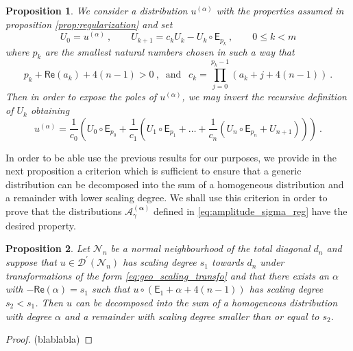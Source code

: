 \documentclass[12pt]{book}
\renewcommand{\Re}{\mathsf{Re}}
\newcommand{\Acal}{\mathcal{A}}
\newcommand{\Dcal}{\mathcal{D}}
\newcommand{\Ncal}{\mathcal{N}}
\newcommand{\Esf}{\mathsf{E}}
\theoremstyle{break}
\newtheorem{proposition}{Proposition}
\begin{document}
\begin{proposition}\label{prop:expose_poles}
We consider a distribution $u^{(\alpha)}$ with the properties assumed in proposition \ref{prop:regularization} and set
%
\begin{equation*}
U_0 = u^{(\alpha)} \ , \qquad U_{k+1} = c_k U_k - U_k \circ \Esf_{p_k} \ , \qquad 0 \leq k < m 
\end{equation*}
%
where $p_k$ are the smallest natural numbers chosen in such a way that 
%
\begin{equation*}
p_k+\Re(a_k)+4(n-1)>0 \ , \ \mbox{ and } \ \ c_k = \prod_{j=0}^{p_k-1} \left(a_k+j+4(n-1)\right) \ .
\end{equation*}
%
Then in order to expose the poles of $u^{(\alpha)}$, we may invert the recursive definition of $U_k$ obtaining
%
\begin{equation*}
u^{(\alpha)} = \frac{1}{c_0} \left( U_0\circ \Esf_{p_0} +  \frac{1}{c_1} \left( U_1 \circ \Esf_{p_1} +\dots + \frac{1}{c_n} \left( U_n \circ \Esf_{p_n} + U_{n+1} \right) \right) \right) \ .
\end{equation*}
%
\end{proposition}


In order to be able use the previous results for our purposes, we provide in the next proposition a criterion which is sufficient to ensure that a generic distribution can be decomposed into the sum of a homogeneous distribution and a remainder with lower scaling degree. We shall use this criterion in order to prove that the distributions $\Acal_\gamma^{(\boldsymbol{\alpha})}$ defined in \eqref{eq:amplitude_sigma_reg} have the desired property.


\begin{proposition}\label{prop:set}
Let $\Ncal_n$ be a normal neighbourhood of the total diagonal $d_n$ and suppose that $u\in \Dcal^\prime(\Ncal_n)$ has scaling degree $s_1$ towards $d_n$ under transformations of the form \eqref{eq:geo_scaling_transfo} and that there exists an $\alpha$ with $-\Re(\alpha)=s_1$ such that $u\circ(\Esf_1+\alpha+4(n-1))$ has scaling degree $s_2 < s_1$. Then $u$ can be decomposed into the sum of a homogeneous distribution with degree $\alpha$ and a remainder with scaling degree smaller than or equal to $s_2$.
\end{proposition}


\begin{proof}
(blablabla)
\end{proof}


\end{document}

